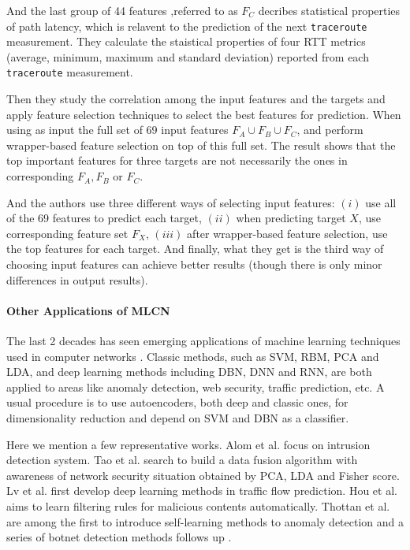 \documentclass[sigconf]{acmart}
\begin{document}
And the last group of 44 features ,referred to as $F_C$ decribes statistical properties of path latency, which is relavent to the prediction of the next \texttt{traceroute} measurement. They calculate the staistical properties of four RTT metrics (average, minimum, maximum and standard deviation) reported from each \texttt{traceroute} measurement.
 

Then they study the correlation among the input features and the targets and apply  feature selection techniques to select the best features for prediction. When using as input the full set of 69 input features $F_A \cup F_B \cup F_C$, and perform wrapper-based feature selection on top of this full set. The result shows that the top important features for three targets are not necessarily the ones in corresponding $F_A,F_B$ or $F_C$.
 

And the authors use three different ways of selecting input features: $(i)$  use all of the 69 features to predict each target, $(ii)$ when predicting target $X$, use corresponding feature set $F_X$, $(iii)$ after wrapper-based feature selection, use the top features for each target. And finally, what they get is the third way of choosing input features can achieve better results (though there is only minor differences in output results).

\paragraph{Other Applications of MLCN}
The last 2 decades has seen emerging applications of machine learning techniques used in computer networks \cite{kwon2017survey}. Classic methods, such as SVM, RBM, PCA and LDA, and deep learning methods including DBN, DNN and RNN, are both applied to areas like anomaly detection, web security, traffic prediction, etc. A usual procedure is to use autoencoders, both deep and classic ones, for dimensionality reduction and depend on SVM and DBN as a classifier.

Here we mention a few representative works. Alom et al. \cite{alom2015intrusion} focus on intrusion detection system. Tao et al. \cite{tao2016big} search to build a data fusion algorithm with awareness of network security situation obtained by PCA, LDA and Fisher score. Lv et al. \cite{lv2015traffic} first develop deep learning methods in traffic flow prediction. Hou et al. \cite{hou2010malicious} aims to learn filtering rules for malicious contents automatically. Thottan et al.~\cite{thottan2003anomaly} are among the first to introduce self-learning methods to anomaly detection and a series of botnet detection methods follows up \cite{ranjan2014machine, singh2014big, beigi2014towards, zhao2013botnet}.
\end{document}
